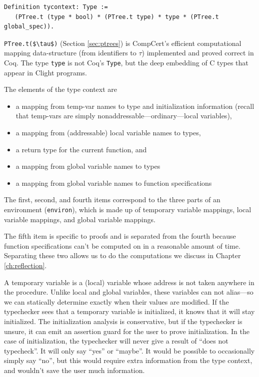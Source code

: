 \documentclass{puthesis}
\begin{document}
\begin{lstlisting}
Definition tycontext: Type :=
   (PTree.t (type * bool) * (PTree.t type) * type * (PTree.t global_spec)).
\end{lstlisting}
\lstinline|PTree.t($\tau$)| (Section \ref{sec:ptrees}) is CompCert's efficient computational mapping
data-structure (from identifiers to $\tau$) implemented and proved
correct in Coq. The type
\lstinline|type| is not Coq's \lstinline|Type|, but the deep embedding
of C types that appear in Clight programs.

The elements of the type context are
\begin{itemize}
  \item a mapping from temp-var names to type and initialization
  information (recall that temp-vars are simply nonaddressable---ordinary---local variables),
  \item a mapping from (addressable) local variable names to types,
  \item a return type for the current function, and
  \item a mapping from global variable names to types
  \item a mapping from global variable names to function specifications
\end{itemize}

The first, second, and fourth items correspond to the three parts of
an environment (\lstinline|environ|), which is made up of temporary
variable mappings, local variable mappings, and global variable
mappings.

The fifth item is specific to proofs and is separated from the fourth
because function specifications can't be computed on in a reasonable
amount of time. Separating these two allows us to do the computations
we discuss in Chapter \ref{ch:reflection}. 

A temporary variable is a (local) variable whose address is not taken
anywhere in the procedure.  Unlike local and global variables, these
variables can not alias---so we can statically determine exactly when
their values are modified. If the typechecker sees that a temporary
variable is initialized, it knows that it will stay initialized. The
initialization analysis is conservative, but if the typechecker is
unsure, it can emit an assertion guard for the user to prove
initialization. In the case of initialization, the typechecker will
never give a result of ``does not typecheck''. It will only say
``yes'' or ``maybe''. It would be possible to occasionally simply say
``no'', but this would require extra information from the type
context, and wouldn't save the user much information. 
\end{document}
